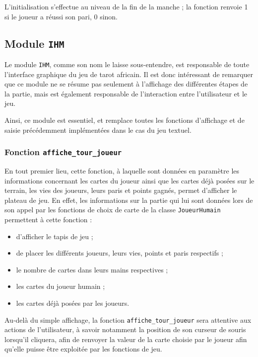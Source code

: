          L'initialisation s'effectue au niveau de la fin de la manche ;
         la fonction renvoie 1 si le joueur a réussi son pari, 0 sinon.

   \subsection{Module \texttt{IHM}}\label{subsec:module-ihm}
      Le module \texttt{IHM}, comme son nom le laisse sous-entendre, est responsable de toute l'interface graphique du jeu de tarot africain.
      Il est donc intéressant de remarquer que ce module ne se résume pas seulement à l'affichage des différentes étapes de la partie, mais est également responsable de l'interaction entre l'utilisateur et le jeu.

      Ainsi, ce module est essentiel, et remplace toutes les fonctions d'affichage et de saisie précédemment implémentées dans le cas du jeu textuel.

      \subsubsection{Fonction \texttt{affiche\_tour\_joueur}}
         En tout premier lieu, cette fonction, à laquelle sont données en paramètre les informations concernant les cartes du joueur ainsi que les cartes déjà posées sur le terrain, les vies des joueurs, leurs paris et points gagnés, permet d'afficher le plateau de jeu.
         En effet, les informations sur la partie qui lui sont données lors de son appel par les fonctions de choix de carte de la classe \texttt{JoueurHumain} permettent à cette fonction :
         \begin{itemize}
            \item d'afficher le tapis de jeu ;
            \item de placer les différents joueurs, leurs vies, points et paris respectifs ;
            \item le nombre de cartes dans leurs mains respectives ;
            \item les cartes du joueur humain ;
            \item les cartes déjà posées par les joueurs.
         \end{itemize}

         Au-delà du simple affichage, la fonction \texttt{affiche\_tour\_joueur} sera attentive aux actions de l'utilisateur, à savoir notamment la position de son curseur de souris lorsqu'il cliquera, afin de renvoyer la valeur de la carte choisie par le joueur afin qu'elle puisse être exploitée par les fonctions de jeu.

